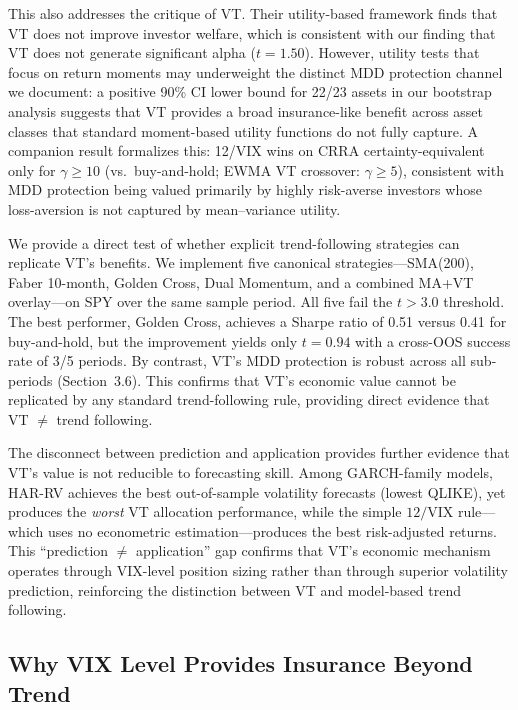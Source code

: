 This also addresses the \citet{cederburg2020} critique of VT. Their utility-based framework finds that VT does not improve investor welfare, which is consistent with our finding that VT does not generate significant alpha ($t = 1.50$). However, utility tests that focus on return moments may underweight the distinct MDD protection channel we document: a positive 90\% CI lower bound for 22/23 assets in our bootstrap analysis suggests that VT provides a broad insurance-like benefit across asset classes that standard moment-based utility functions do not fully capture. A companion result formalizes this: 12/VIX wins on CRRA certainty-equivalent only for $\gamma \geq 10$ (vs.\ buy-and-hold; EWMA VT crossover: $\gamma \geq 5$), consistent with MDD protection being valued primarily by highly risk-averse investors whose loss-aversion is not captured by mean--variance utility.

We provide a direct test of whether explicit trend-following strategies can replicate VT's benefits. We implement five canonical strategies---SMA(200), Faber 10-month, Golden Cross, Dual Momentum, and a combined MA+VT overlay---on SPY over the same sample period. All five fail the \citet{harvey2016} $t > 3.0$ threshold. The best performer, Golden Cross, achieves a Sharpe ratio of 0.51 versus 0.41 for buy-and-hold, but the improvement yields only $t = 0.94$ with a cross-OOS success rate of 3/5 periods. By contrast, VT's MDD protection is robust across all sub-periods (Section~3.6). This confirms that VT's economic value cannot be replicated by any standard trend-following rule, providing direct evidence that VT $\neq$ trend following.

The disconnect between prediction and application provides further evidence that VT's value is not reducible to forecasting skill. Among GARCH-family models, HAR-RV achieves the best out-of-sample volatility forecasts (lowest QLIKE), yet produces the \textit{worst} VT allocation performance, while the simple $12/\text{VIX}$ rule---which uses no econometric estimation---produces the best risk-adjusted returns. This ``prediction $\neq$ application'' gap confirms that VT's economic mechanism operates through VIX-level position sizing rather than through superior volatility prediction, reinforcing the distinction between VT and model-based trend following.

\subsection{Why VIX Level Provides Insurance Beyond Trend}

